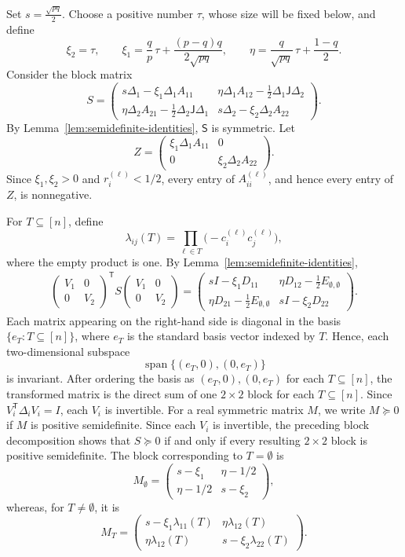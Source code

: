 \documentclass[11pt]{article}
\numberwithin{equation}{section}
\theoremstyle{definition}
\theoremstyle{remark}
\begin{document}
Set
$
 s=\frac{\sqrt{pq}}2.
$
Choose a positive number $\tau$, whose size will be fixed below, and
define
$$
 \xi_2=\tau,\qquad
 \xi_1
 =
 \frac{q}{p}\,\tau
 +\frac{(p-q)q}{2\sqrt{pq}},
 \qquad
 \eta
 =
 \frac q{\sqrt{pq}}\,\tau+\frac{1-q}{2}.
$$
Consider the  block matrix
$$
  S
 =
 \begin{pmatrix}
  s\Delta_1-\xi_1\Delta_1A_{11}&
  \eta\Delta_1A_{12}
  -\frac12\Delta_1\mathsf J\Delta_2\\[2pt]
  \eta\Delta_2A_{21}
  -\frac12\Delta_2\mathsf J\Delta_1&
  s\Delta_2-\xi_2\Delta_2A_{22}
 \end{pmatrix}.
$$
By Lemma~\ref{lem:semidefinite-identities}, $\mathsf S$ is symmetric.
Let
$$
 Z
 =
 \begin{pmatrix}
  \xi_1\Delta_1A_{11}&0\\
  0&\xi_2\Delta_2A_{22}
 \end{pmatrix}.
$$
Since $\xi_1,\xi_2>0$ and $r_i^{(\ell)}<1/2$, every entry of
$A_{ii}^{(\ell)}$, and hence every entry of $Z$, is
nonnegative.

For $T\subseteq[n]$, define
$$
 \lambda_{ij}(T)
 =
 \prod_{\ell\in T}
 \bigl(-c_i^{(\ell)}c_j^{(\ell)}\bigr),
$$
where the empty product is one.  By Lemma~\ref{lem:semidefinite-identities},
\begin{align}
\begin{pmatrix}V_1&0\\0&V_2\end{pmatrix}^{\mathsf T}
 S
\begin{pmatrix}V_1&0\\0&V_2\end{pmatrix}=
\begin{pmatrix}
 sI-\xi_1D_{11}&
 \eta D_{12}-\frac12E_{\emptyset,\emptyset}\\
 \eta D_{21}-\frac12E_{\emptyset,\emptyset}&
 sI-\xi_2D_{22}
\end{pmatrix}.\label{ff1}
\end{align}
Each matrix appearing on the right-hand side is diagonal in the basis
$\{e_T:T\subseteq[n]\}$, where  $e_{T}$ is the standard basis vector indexed by $T$. Hence, each two-dimensional subspace
$$
 \operatorname{span}\{(e_T,0),(0,e_T)\}
$$
is invariant. After ordering the basis as
$(e_T,0),(0,e_T)$ for each $T\subseteq[n]$, the transformed matrix is
the direct sum of one $2\times2$ block for each $T\subseteq[n]$.  Since
$V_i^{\mathsf T}\Delta_iV_i=I$, each $V_i$ is invertible.
For a real symmetric matrix $ M$, we write
$ M\succeq0$ if $ M$ is positive semidefinite.
Since each $V_i$ is invertible, the preceding block decomposition
shows that $ S\succeq0$ if and only if every resulting
$2\times2$ block is positive semidefinite.  The block corresponding to
$T=\emptyset$ is
$$
 M_{\emptyset}
 =
 \begin{pmatrix}
  s-\xi_1&\eta-1/2\\
  \eta-1/2&s-\xi_2
 \end{pmatrix},
$$
whereas, for $T\neq\emptyset$, it is
$$
 M_T
 =
 \begin{pmatrix}
  s-\xi_1\lambda_{11}(T)&
  \eta\lambda_{12}(T)\\
  \eta\lambda_{12}(T)&
  s-\xi_2\lambda_{22}(T)
 \end{pmatrix}.
$$
\end{document}

